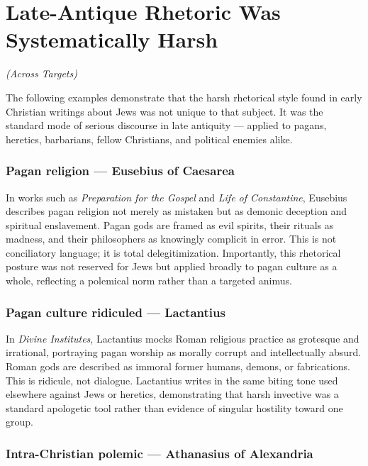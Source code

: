 \documentclass[10pt,twoside,openany]{book}
\begin{document}

\chapter{Late-Antique Rhetoric Was Systematically Harsh}
\begin{center}
{\itshape (Across Targets)}
\end{center}

The following examples demonstrate that the harsh rhetorical style
found in early Christian writings about Jews was not unique to that
subject. It was the standard mode of serious discourse in late
antiquity --- applied to pagans, heretics, barbarians, fellow
Christians, and political enemies alike.

\subsection{Pagan religion --- Eusebius of Caesarea}

In works such as \emph{Preparation for the Gospel} and \emph{Life of Constantine},
Eusebius describes pagan religion not merely as mistaken but as demonic
deception and spiritual enslavement. Pagan gods are framed as evil
spirits, their rituals as madness, and their philosophers as knowingly
complicit in error. This is not conciliatory language; it is total
delegitimization. Importantly, this rhetorical posture was not reserved
for Jews but applied broadly to pagan culture as a whole, reflecting a
polemical norm rather than a targeted animus.

\subsection{Pagan culture ridiculed --- Lactantius}

In \emph{Divine Institutes}, Lactantius mocks Roman religious practice as
grotesque and irrational, portraying pagan worship as morally corrupt
and intellectually absurd. Roman gods are described as immoral former
humans, demons, or fabrications. This is ridicule, not dialogue.
Lactantius writes in the same biting tone used elsewhere against Jews
or heretics, demonstrating that harsh invective was a standard
apologetic tool rather than evidence of singular hostility toward one
group.

\subsection{Intra-Christian polemic --- Athanasius of Alexandria}
\end{document}
